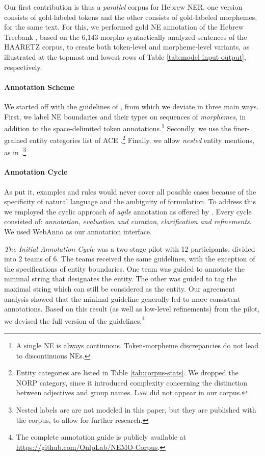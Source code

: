 \documentclass[11pt,a4paper]{article}
\begin{document}
Our  first contribution is thus a   {\em parallel} corpus for Hebrew NER, one version consists of gold-labeled tokens and the other consists of gold-labeled morphemes, for the same text. 
For this, we performed gold NE annotation of the Hebrew Treebank \cite{simaan2001}, based on the 6,143  morpho-syntactically analyzed sentences of the HAARETZ corpus, to create both token-level and morpheme-level variants, as illustrated   at the topmost and lowest rows of Table \ref{tab:model-input-output}, respectively.


\paragraph{Annotation Scheme} We  started off with the guidelines of \citet{naama}, from which we deviate in three main ways. First, 
we label NE boundaries and their types on sequences of {\em morphemes}, 
in addition to the space-delimited token annotations.\footnote{A single NE is always continuous. Token-morpheme discrepancies do not lead to discontinuous NEs.}
Secondly, we use the  finer-grained entity categories list of ACE \cite{linguistic2008ace}.\footnote{Entity categories are listed in Table \ref{tab:corpus-stats}.
We dropped the \textsc{NORP} category, since it introduced complexity concerning the distinction between adjectives and group names. \textsc{Law} did not appear in our corpus.}
Finally, we allow {\em nested} entity mentions, as in  \citet{Finkel:2009:NNE:1699510.1699529,benikova-etal-2014-nosta}.\footnote{Nested labels are  are not modeled in this paper, but they are published with the corpus, to allow for further research.}


\paragraph{Annotation Cycle}
As  \citet{fort-etal-2009-towards} put it,
examples and rules would never cover all possible cases because of the specificity of natural language and the ambiguity of formulation.
To address this we employed the cyclic approach of 
{\em agile}  annotation as offered by \citet{alex-etal-2010-agile}. Every cycle consisted of: {\em annotation}, {\em evaluation and  curation}, {\em clarification and  refinements}.  We used WebAnno \cite{yimam-etal-2013-webanno} as our annotation interface. 

{\em The Initial Annotation Cycle} was  a two-stage pilot with 12 participants, divided into 2 teams of 6. 
The teams received the same guidelines, with the exception of the specifications of entity boundaries. One team was guided to annotate the minimal string that designates the entity. The other was guided to tag the maximal string which can still be considered as the entity. Our agreement analysis showed that the minimal guideline generally led to more consistent annotations.
Based on this result (as well as low-level refinements) from the pilot,  we devised the  full version of the guidelines.\footnote{The complete annotation guide is publicly available at \scriptsize{\url{https://github.com/OnlpLab/NEMO-Corpus}}.} 
\end{document}
